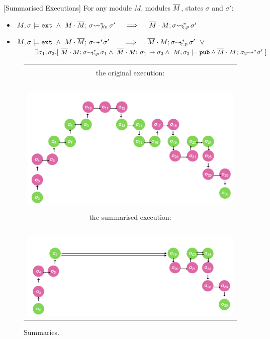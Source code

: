 
 \begin{auxLemma}
\label{lemma:external_breakdown:term}[Summarised Executions]
For any module $M$, modules $\overline{M}$, states $\sigma$ and $\sigma'$:
\\
\begin{itemize}
\item
$M,\sigma \models \extThis\ \wedge \ \leadstoBoundedStarFin {M\cdot \Mtwo}  {\sigma}  {\sigma'}  \ \ \  \ 
\Longrightarrow \ \ \  \ \leadstoBoundedExtPub {\Mtwo\cdot M}    {\sigma}  {\sigma'}$
\item
$M,\sigma \models \extThis\ \wedge \ \leadstoBoundedStar  {M\cdot \Mtwo}  {\sigma}  {\sigma'}  \ \ \  \ \ \  
\Longrightarrow \ \ \  \  \leadstoBoundedExtPub {\Mtwo\cdot M}    {\sigma}  {\sigma'}\ \ \vee$\\
$\strut \ \ \ \ \ \ \ \    \exists \sigma_1,\sigma_2.[\ 
\leadstoBoundedExtPub {\Mtwo\cdot M}    {\sigma}  {\sigma_1} 
\wedge\ \leadstoBounded  {\Mtwo\cdot M}    {\sigma_1}  {\sigma_2} 
\wedge \ M, \sigma_2 \models \pubMeth \wedge \leadstoBoundedStar  {\Mtwo\cdot M}    {\sigma_2}  {\sigma'} \ ]
$
\end{itemize}
\end{auxLemma}


\begin{figure}[htb]
\begin{tabular}{c}
\hline \\
the original execution:
\\
~ \\
\resizebox{9cm}{!}
{
\includegraphics[width=\linewidth]{diagrams/summaryA.png}
} 
\\
\hline \\
the summarised execution:
\\
~ \\
\resizebox{9cm}{!}
{
\includegraphics[width=\linewidth]{diagrams/summaryB.png}
} 
\\
\hline \hline
\end{tabular}
   \caption{Summaries. 
   }
   \label{fig:summaries}
 \end{figure}

